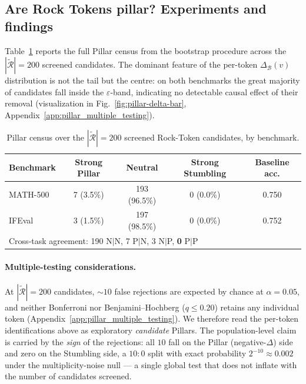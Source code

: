 \subsection{Are Rock Tokens pillar? Experiments and findings}
\label{sec:pillar-experiments}

Table~\ref{tab:pillar-census} reports the full Pillar census from the bootstrap procedure across the $|\widetilde{\mathcal{R}}|=200$ screened candidates. The dominant feature of the per-token $\Delta_\mathcal{B}(v)$ distribution is not the tail but the centre: on both benchmarks the great majority of candidates fall inside the $\varepsilon$-band, indicating no detectable causal effect of their removal (visualization in Fig.~\ref{fig:pillar-delta-bar}, Appendix~\ref{app:pillar_multiple_testing}).

\begin{table}[t]
\centering
\caption{Pillar census over the $|\widetilde{\mathcal{R}}|=200$ screened Rock-Token candidates, by benchmark.}
\label{tab:pillar-census}
\begin{tabular}{lcccc}
\toprule
\textbf{Benchmark} & \textbf{Strong Pillar} & \textbf{Neutral} & \textbf{Strong Stumbling} & \textbf{Baseline acc.} \\
\midrule
MATH-500 & 7 (3.5\%)  & 193 (96.5\%) & 0 (0.0\%) & 0.750 \\
IFEval   & 3 (1.5\%)  & 197 (98.5\%) & 0 (0.0\%) & 0.752 \\
\midrule
\multicolumn{4}{l}{Cross-task agreement: 190 N$|$N, 7 P$|$N, 3 N$|$P, \textbf{0} P$|$P} & \\
\bottomrule
\end{tabular}
\end{table}

\paragraph{Multiple-testing considerations.} At $|\widetilde{\mathcal{R}}|=200$ candidates, $\sim\!10$ false rejections are expected by chance at $\alpha=0.05$, and neither Bonferroni nor Benjamini--Hochberg ($q\le 0.20$) retains any individual token (Appendix~\ref{app:pillar_multiple_testing}). We therefore read the per-token identifications above as exploratory \emph{candidate} Pillars. The population-level claim is carried by the \emph{sign} of the rejections: all $10$ fall on the Pillar (negative-$\Delta$) side and zero on the Stumbling side, a $10{:}0$ split with exact probability $2^{-10}\approx 0.002$ under the multiplicity-noise null --- a single global test that does not inflate with the number of candidates screened.

